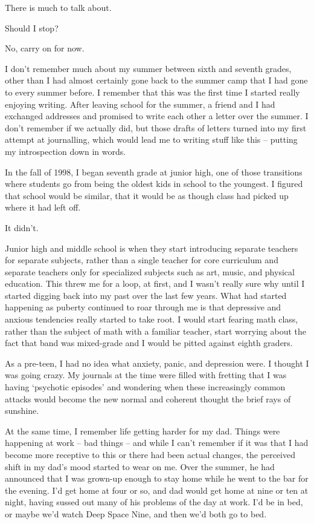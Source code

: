 \begin{paracol}{2}
\begin{leftcolumn}
\begin{ally}
There is much to talk about.
\end{ally}
Should I stop?

\begin{ally}
No, carry on for now.
\end{ally}
I don't remember much about my summer between sixth and seventh grades, other than I had almost certainly gone back to the summer camp that I had gone to every summer before. I remember that this was the first time I started really enjoying writing. After leaving school for the summer, a friend and I had exchanged addresses and promised to write each other a letter over the summer. I don't remember if we actually did, but those drafts of letters turned into my first attempt at journalling, which would lead me to writing stuff like this -- putting my introspection down in words.

In the fall of 1998, I began seventh grade at junior high, one of those transitions where students go from being the oldest kids in school to the youngest. I figured that school would be similar, that it would be as though class had picked up where it had left off.

It didn't.

Junior high and middle school is when they start introducing separate teachers for separate subjects, rather than a single teacher for core curriculum and separate teachers only for specialized subjects such as art, music, and physical education. This threw me for a loop, at first, and I wasn't really sure why until I started digging back into my past over the last few years. What had started happening as puberty continued to roar through me is that depressive and anxious tendencies really started to take root. I would start fearing math class, rather than the subject of math with a familiar teacher, start worrying about the fact that band was mixed-grade and I would be pitted against eighth graders.

As a pre-teen, I had no idea what anxiety, panic, and depression were. I thought I was going crazy. My journals at the time were filled with fretting that I was having `psychotic episodes' and wondering when these increasingly common attacks would become the new normal and coherent thought the brief rays of sunshine.

At the same time, I remember life getting harder for my dad. Things were happening at work -- bad things -- and while I can't remember if it was that I had become more receptive to this or there had been actual changes, the perceived shift in my dad's mood started to wear on me. Over the summer, he had announced that I was grown-up enough to stay home while he went to the bar for the evening. I'd get home at four or so, and dad would get home at nine or ten at night, having sussed out many of his problems of the day at work. I'd be in bed, or maybe we'd watch Deep Space Nine, and then we'd both go to bed.


\end{leftcolumn}
\end{paracol}
